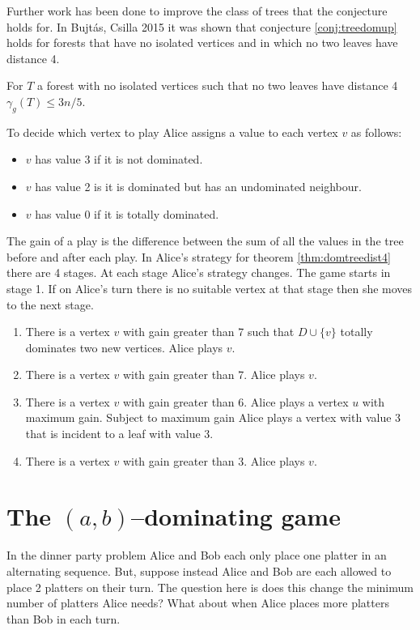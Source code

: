 Further work has been done to improve the class of trees that the conjecture holds for. In Bujt\'{a}s, Csilla 2015 \cite{Bujt2015} it was shown that conjecture \ref{conj:treedomup} holds for forests that have no isolated vertices and in which no two leaves have distance 4.
%
\begin{theorem}\label{thm:domtreedist4}
    For $T$ a forest with no isolated vertices such that no two leaves have distance 4
    $\gamma_g(T)\leq 3n/5$.
\end{theorem}
To decide which vertex to play Alice assigns a value to each vertex $v$ as follows: 
\begin{itemize}
    \item $v$ has value 3 if it is not dominated.
    \item $v$ has value 2 is it is dominated but has an undominated neighbour.
    \item $v$ has value 0 if it is totally dominated.
\end{itemize}
The gain of a play is the difference between the sum of all the values in the tree before and after each play. In Alice's strategy for theorem \ref{thm:domtreedist4} there are 4 stages. At each stage Alice's strategy changes. The game starts in stage 1. If on Alice's turn there is no suitable vertex at that stage then she moves to the next stage. 
\begin{enumerate}[St{a}ge 1:]
    \item There is a vertex $v$ with gain greater than 7 such that $D\cup\{v\}$ totally dominates two new vertices. Alice plays $v$.
    \item There is a vertex $v$ with gain greater than 7. Alice plays $v$.
    \item There is a vertex $v$ with gain greater than 6. Alice plays a vertex $u$ with maximum gain. Subject to maximum gain Alice plays a vertex with value 3 that is incident to a leaf with value 3.
    \item There is a vertex $v$ with gain greater than 3. Alice plays $v$.
\end{enumerate}

\section{The $(a,b)$--dominating game}

In the dinner party problem Alice and Bob each only place one platter in an alternating sequence. But, suppose instead Alice and Bob are each allowed to place 2 platters on their turn. The question here is does this change the minimum number of platters Alice needs? What about when Alice places more platters than Bob in each turn.


